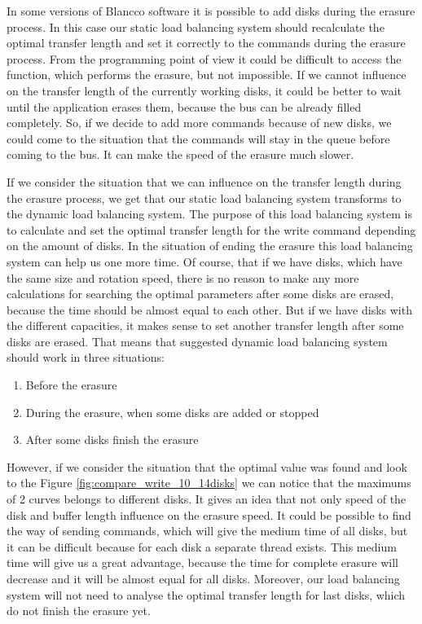 In some versions of Blancco software it is possible to add disks during the erasure process. In this case our static load balancing system should recalculate the optimal transfer length and set it correctly to the commands during the erasure process. From the programming point of view it could be difficult to access the function, which performs the erasure, but not impossible. If we cannot influence on the transfer length of the currently working disks, it could be better to wait until the application erases them, because the bus can be already filled completely. So, if we decide to add more commands because of new disks, we could come to the situation that the commands will stay in the queue before coming to the bus. It can make the speed of the erasure much slower.

If we consider the situation that we can influence on the transfer length during the erasure process, we get that our static load balancing system transforms to the dynamic load balancing system. The purpose of this load balancing system is to calculate and set the optimal transfer length for the write command depending on the amount of disks. In the situation of ending the erasure this load balancing system can help us one more time. Of course, that if we have disks, which have the same size and rotation speed, there is no reason to make any more calculations for searching the optimal parameters after some disks are erased, because the time should be almost equal to each other. But if we have disks with the different capacities, it makes sense to set another transfer length after some disks are erased. That means that suggested dynamic load balancing system should work in three situations:
\begin{enumerate}
	\setlength{\itemsep}{-2mm}
	\item Before the erasure
	\item During the erasure, when some disks are added or stopped
	\item After some disks finish the erasure
\end{enumerate}

However, if we consider the situation that the optimal value was found and look to the Figure \ref{fig:compare_write_10_14disks} we can notice that the maximums of 2 curves belongs to different disks. It gives an idea that not only speed of the disk and buffer length influence on the erasure speed. It could be possible to find the way of sending commands, which will give the medium time of all disks, but it can be difficult because for each disk a separate thread exists. This medium time will give us a great advantage, because the time for complete erasure will decrease and it will be almost equal for all disks. Moreover, our load balancing system will not need to analyse the optimal transfer length for last disks, which do not finish the erasure yet.

